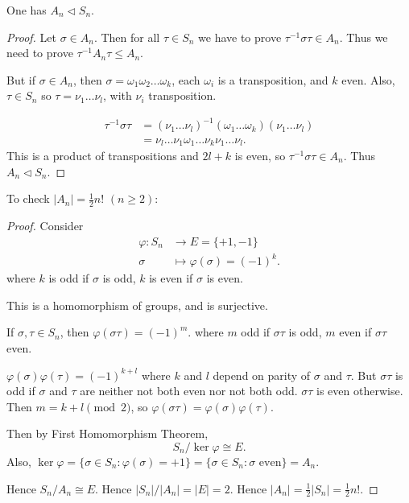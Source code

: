 
\begin{theorem}
	One has $A_n \triangleleft S_n$.
\end{theorem}
\begin{proof}
	Let $\sigma \in A_n$. Then for all $\tau\in S_n$ we have to prove $\tau^{-1} \sigma\tau \in A_n$. Thus we need to prove $\tau^{-1} A_n \tau \le A_n$. 

	But if $\sigma \in A_n$, then $\sigma = \omega_1\omega_2\ldots\omega_k$, each $\omega_i$ is a transposition, and $k$ even. Also, $\tau \in S_n$ so $\tau = \nu_1\ldots\nu_l$, with $\nu_i$ transposition.

	\begin{align*}
		\tau^{-1} \sigma\tau
		&= (\nu_1\ldots\nu_l)^{-1} (\omega_1\ldots\omega_k) (\nu_1\ldots\nu_l) \\
		&= \nu_l \ldots\nu_1 \omega_1\ldots\nu_k \nu_1\ldots\nu_l 
	.\end{align*}
	This is a product of transpositions and $2 l + k$ is even, so $\tau^{-1} \sigma\tau \in A_n$. Thus $A_n \triangleleft S_n$.
\end{proof}

To check $|A_n| = \frac{1}{2}n!$ \quad $(n\ge 2)$:
\begin{proof}
	Consider
	\begin{align*}
		\varphi: S_n &\longrightarrow E = \{+1, -1\}  \\
		\sigma &\longmapsto \varphi(\sigma) = (-1)^k
	.\end{align*}
	where $k$ is odd if $\sigma$ is odd, $k$ is even if $\sigma$ is even.

	\begin{claim}
		This is a homomorphism of groups, and is surjective.
	\end{claim}
	If $\sigma, \tau \in S_n$, then $\varphi(\sigma\tau) = (-1)^m .$ where $m$ odd if $\sigma\tau$ is odd, $m$ even if $\sigma\tau$ even.
	
	$\varphi(\sigma)\varphi(\tau) = (-1)^{k+l}$ where $k$ and $l$ depend on parity of $\sigma$ and $\tau$. 
	But $\sigma\tau$ is odd if $\sigma$ and $\tau$ are neither not both even nor not both odd. $\sigma\tau$ is even otherwise. Then $m = k + l \pmod 2$, so $\varphi(\sigma\tau) = \varphi(\sigma)\varphi(\tau)$.

	Then by First Homomorphism Theorem, 
	\[
		S_n / \operatorname{ker} \varphi \cong E
	.\] 
	Also, $\operatorname{ker} \varphi = \{\sigma \in S_n: \varphi(\sigma) = +1\} = \{\sigma \in S_n: \sigma \text{ even}\}  = A_n$.

	Hence $S_n / A_n \cong E$. Hence $|S_n| / |A_n| = |E| = 2$. Hence $|A_n| = \frac{1}{2} |S_n| = \frac{1}{2} n!$.

\end{proof}

